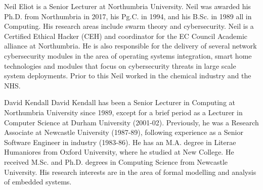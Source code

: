 \documentclass[10pt,journal]{IEEEtran}
\begin{document}
\begin{IEEEbiography}{Neil Eliot}
is a Senior Lecturer at Northumbria University.  Neil was awarded his Ph.D. from Northumbria in 2017, his Pg.C. in 1994, and his B.Sc. in 1989 all in Computing. His research areas include swarm theory and cybersecurity. Neil is a Certified Ethical Hacker (CEH) and coordinator for the EC Council Academic alliance at Northumbria. He is also responsible for the delivery of several network cybersecurity modules in the area of operating systems integration, smart home technologies and modules that focus on cybersecurity threats in large scale system deployments. Prior to this Neil worked in the chemical industry and the NHS.
\end{IEEEbiography}

\begin{IEEEbiography}{David Kendall}
David Kendall has been a Senior Lecturer in Computing at Northumbria University since 1989, except for a brief period as a Lecturer in Computer Science at Durham University (2001-02). Previously, he was a Research Associate at Newcastle University (1987-89), following experience as a Senior Software Engineer in industry (1983-86). He has an M.A. degree in Literae Humaniores from Oxford University, where he studied at New College. He received M.Sc. and Ph.D. degrees in Computing Science from Newcastle University. His research interests are in the area of formal modelling and analysis of embedded systems. 
\end{IEEEbiography}
\end{document}
